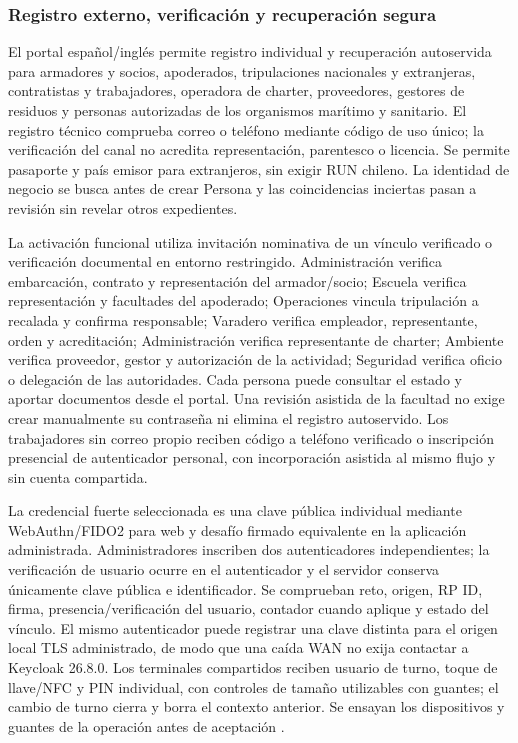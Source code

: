 \subsubsection{Registro externo, verificación y recuperación segura}
\label{subsec:sd5_externos_cierre}

El portal español/inglés permite registro individual y recuperación autoservida para armadores y socios, apoderados, tripulaciones nacionales y extranjeras, contratistas y trabajadores, operadora de charter, proveedores, gestores de residuos y personas autorizadas de los organismos marítimo y sanitario. El registro técnico comprueba correo o teléfono mediante código de uso único; la verificación del canal no acredita representación, parentesco o licencia. Se permite pasaporte y país emisor para extranjeros, sin exigir RUN chileno. La identidad de negocio se busca antes de crear Persona y las coincidencias inciertas pasan a revisión sin revelar otros expedientes.

La activación funcional utiliza invitación nominativa de un vínculo verificado o verificación documental en entorno restringido. Administración verifica embarcación, contrato y representación del armador/socio; Escuela verifica representación y facultades del apoderado; Operaciones vincula tripulación a recalada y confirma responsable; Varadero verifica empleador, representante, orden y acreditación; Administración verifica representante de charter; Ambiente verifica proveedor, gestor y autorización de la actividad; Seguridad verifica oficio o delegación de las autoridades. Cada persona puede consultar el estado y aportar documentos desde el portal. Una revisión asistida de la facultad no exige crear manualmente su contraseña ni elimina el registro autoservido. Los trabajadores sin correo propio reciben código a teléfono verificado o inscripción presencial de autenticador personal, con incorporación asistida al mismo flujo y sin cuenta compartida.

La credencial fuerte seleccionada es una clave pública individual mediante WebAuthn/FIDO2 para web y desafío firmado equivalente en la aplicación administrada. Administradores inscriben dos autenticadores independientes; la verificación de usuario ocurre en el autenticador y el servidor conserva únicamente clave pública e identificador. Se comprueban reto, origen, RP ID, firma, presencia/verificación del usuario, contador cuando aplique y estado del vínculo. El mismo autenticador puede registrar una clave distinta para el origen local TLS administrado, de modo que una caída WAN no exija contactar a Keycloak 26.8.0. Los terminales compartidos reciben usuario de turno, toque de llave/NFC y PIN individual, con controles de tamaño utilizables con guantes; el cambio de turno cierra y borra el contexto anterior. Se ensayan los dispositivos y guantes de la operación antes de aceptación \parencite{w3c-webauthn}.


